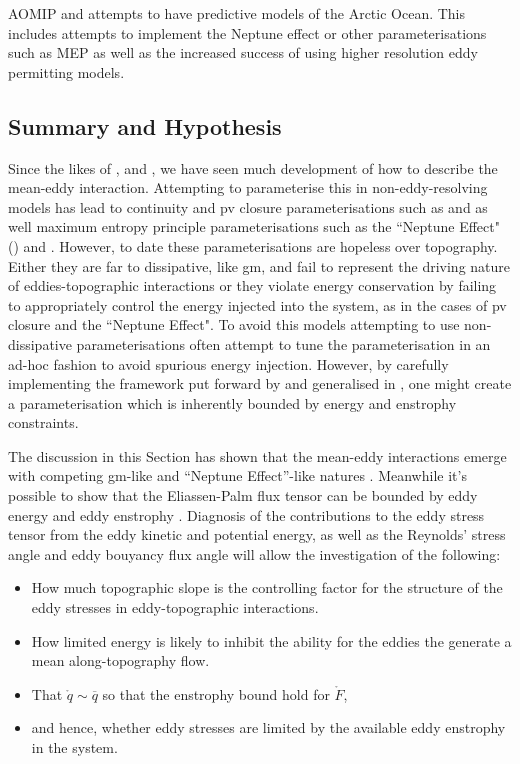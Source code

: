 \documentclass[10pt,a4paper]{article}
\newcommand*\thkmean[1]{\overline{#1}}
\newcommand*\spec[1]{\mathring{#1}}
\begin{document}
AOMIP and attempts to have predictive models of the Arctic Ocean. This includes attempts
to implement the Neptune effect or other parameterisations such as MEP as well as
the increased success of using higher resolution eddy permitting models.

\subsection{Summary and Hypothesis}

Since the likes of \cite{young1982shear}, \cite{holloway1987systematic} and
\cite{gent1990}, we have seen much development of how to describe the mean-eddy interaction.
Attempting to parameterise this in non-eddy-resolving models has lead to 
continuity and \gls{pv} closure parameterisations such as \cite{gent1990}
and \cite{greatbatch1998exploring} as well maximum entropy principle parameterisations 
such as the ``Neptune Effect" (\cite{holloway1992representing}) and \cite{polyakov2001eddy}.
However, to date these parameterisations are hopeless over topography. Either
they are far to dissipative, like \gls{gm}, and fail to represent the driving nature
of eddies-topographic interactions or they violate energy conservation
by failing to appropriately control the energy injected into the system, as in the cases
of \gls{pv} closure and the ``Neptune Effect". To avoid this models attempting to
use non-dissipative parameterisations often attempt to tune the parameterisation in
an ad-hoc fashion to avoid spurious energy injection. However, by carefully implementing
the framework put forward by \cite{marshall2012framework} and generalised in
\cite{maddison2013eliassen}, one might create a parameterisation which is
inherently bounded by energy and enstrophy constraints.

The discussion in this Section has shown that the mean-eddy interactions 
emerge with competing \gls{gm}-like and ``Neptune Effect''-like natures
\cite{adcock2000interactions}. Meanwhile  it's possible to show that
the Eliassen-Palm flux tensor can be bounded by eddy energy and eddy enstrophy
\cite{marshall2012framework}.
Diagnosis of the contributions to the eddy stress tensor from
the eddy kinetic and potential energy, as well as the Reynolds' stress angle and eddy bouyancy flux angle will allow the investigation of the following:
\begin{itemize} 
		\item How much topographic slope is the controlling factor for the structure of the eddy stresses in eddy-topographic interactions.
		\item How limited energy is likely to inhibit the ability for the eddies the
			generate a mean along-topography flow.
	    \item That $\spec{q} \sim \thkmean{q}$ so that the enstrophy bound hold for $\spec{F}$,
		\item and hence, whether eddy stresses are limited by the available eddy enstrophy in the system.
\end{itemize} 
 
\end{document}
